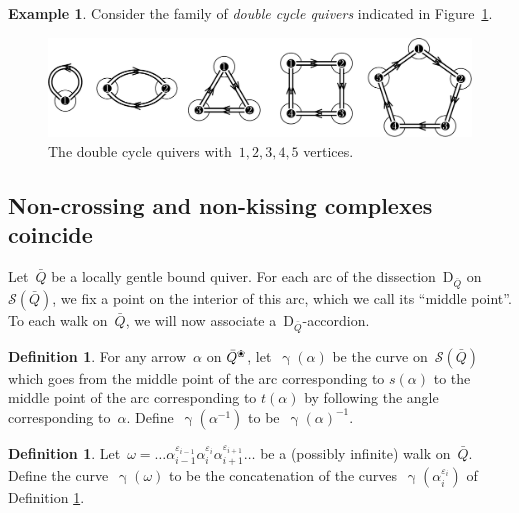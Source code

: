 \documentclass{amsart}
\theoremstyle{definition}
\newtheorem{definition}[theorem]{Definition}
\newtheorem{example}[theorem]{Example}
\newcommand{\fref}[1]{Figure~\ref{#1}} %
\newcommand{\darkblue}{\color{darkblue}} %
\newcommand{\defn}[1]{\textsl{\darkblue #1}} %
\newcommand{\blossom}{^\text{\ding{96}}} %
\newcommand{\surface}{\mathcal{S}} %
\newcommand{\dissection}{\mathrm{D}} %
\newcommand{\curveof}{\operatorname{\gamma}} %
\begin{document}
\begin{example}
\label{exm:doubleCycle}
Consider the family of \defn{double cycle quivers} indicated in \fref{fig:doubleCyclesQuivers}.

\begin{figure}[h]
	\capstart
	\centerline{\includegraphics[scale=.45]{doubleCyclesQuivers}}
	\caption{The double cycle quivers with~$1, 2, 3, 4, 5$ vertices.}
	\label{fig:doubleCyclesQuivers}
\end{figure}

\end{example}

\subsection{Non-crossing and non-kissing complexes coincide}

Let~$\bar Q$ be a locally gentle bound quiver.
For each arc of the dissection~$\dissection_{\bar Q}$ on~$\surface(\bar Q)$, we fix a point on the interior of this arc, which we call its ``middle point''.
To each walk on~$\bar Q$, we will now associate a~$\dissection_{\bar Q}$-accordion.

\begin{definition}
\label{def:curveOfAnArrow}
For any arrow~$\alpha$ on $\bar Q\blossom$, let~$\curveof(\alpha)$ be the curve on~$\surface(\bar Q)$ which goes from the middle point of the arc corresponding to $s(\alpha)$ to the middle point of the arc corresponding to $t(\alpha)$ by following the angle corresponding to~$\alpha$.
Define~$\curveof(\alpha^{-1})$ to be~$\curveof(\alpha)^{-1}$.
\end{definition}


\begin{definition}
\label{def:curveOfAWalk}
Let~$\omega = \ldots \alpha_{i-1}^{\varepsilon_{i-1}}\alpha_{i}^{\varepsilon_i}\alpha_{i+1}^{\varepsilon_{i+1}} \ldots$ be a (possibly infinite) walk on~$\bar Q$. 
Define the curve~$\curveof(\omega)$ to be the concatenation of the curves~$\curveof(\alpha_i^{\varepsilon_{i}})$ of Definition \ref{def:curveOfAnArrow}.
\end{definition}
\end{document}
